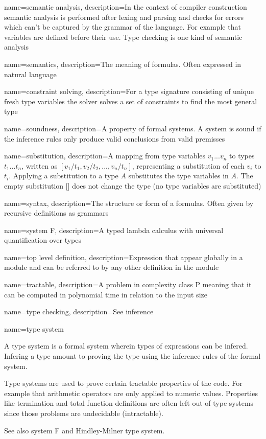 { name={semantic analysis},
  description={In the context of compiler construction semantic analysis is performed after lexing and parsing and checks for errors which can't be captured by the grammar of the language. For example that variables are defined before their use. Type checking is one kind of semantic analysis}
}

{ name={semantics},
  description={The meaning of formulas. Often expressed in natural language}
}

{ name={constraint solving},
  description={For a type signature consisting of unique fresh type variables the solver solves a set of constraints to find the most general type}
}

{ name={soundness},
  description={A property of formal systems. A system is sound if the inference rules only produce valid conclusions from valid premisses}
} %

{ name={substitution},
  description={A mapping from type variables $v_1...v_n$ to types $t_1...t_n$, written as $[v_1/t_1,v_2/t_2,...,v_n/t_n]$, representing a substitution of each $v_i$ to $t_i$. Applying a substitution to a type $A$ substitutes the type variables in $A$. The empty substitution [] does not change the type (no type variables are substituted)}
}

{ name={syntax},
  description={The structure or form of a formulas. Often given by recursive definitions as grammars}
}

{ name={system F},
  description={A typed lambda calculus with universal quantification over types}
}

{ name={top level definition},
  description={Expression that appear globally in a module and can be referred to by any other definition in the module}
}

{ name={tractable},
  description={A problem in complexity class P meaning that it can be computed in polynomial time in relation to the input size}
}

{ name={type checking},
  description={See inference}
}

{ name={type system} }
{A type system is a formal system wherein types of expressions can be infered. Infering a type amount to proving the type using the inference rules of the formal system.

Type systems are used to prove certain tractable properties of the code. For example that arithmetic operators are only applied to numeric values. Properties like termination and total function definitions are often left out of type systems since those problems are undecidable (intractable).

See also system F and Hindley-Milner type system.
}

